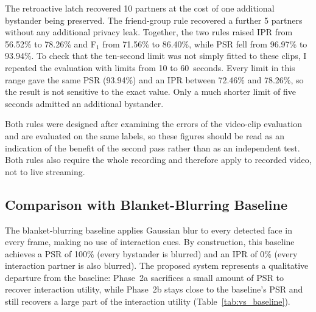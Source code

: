 The retroactive latch recovered 10 partners at the cost of one additional
bystander being preserved. The friend-group rule recovered a further 5 partners
without any additional privacy leak. Together, the two rules raised IPR from 56.52\%
to 78.26\% and F$_1$ from 71.56\% to 86.40\%, while PSR fell from 96.97\% to 93.94\%.
To check that the ten-second limit was not simply fitted to these clips, I repeated
the evaluation with limits from 10 to 60~seconds. Every limit in this range gave the
same PSR (93.94\%) and an IPR between 72.46\% and 78.26\%, so the result is not
sensitive to the exact value. Only a much shorter limit of five seconds admitted an
additional bystander.

Both rules were designed after examining the errors of the video-clip evaluation and
are evaluated on the same labels, so these figures should be read as an indication
of the benefit of the second pass rather than as an independent test. Both rules
also require the whole recording and therefore apply to recorded video, not to
live streaming.

\subsection{Comparison with Blanket-Blurring Baseline}
\label{sec:baseline_comparison}

The blanket-blurring baseline applies Gaussian blur to every detected face in every
frame, making no use of interaction cues. By construction, this baseline achieves a
PSR of 100\% (every bystander is blurred) and an IPR of 0\% (every interaction
partner is also blurred). The proposed system represents a qualitative departure
from the baseline: Phase~2a sacrifices a small amount of PSR to recover interaction
utility, while Phase~2b stays close to the baseline's PSR and still recovers a
large part of the interaction utility (Table~\ref{tab:vs_baseline}).

